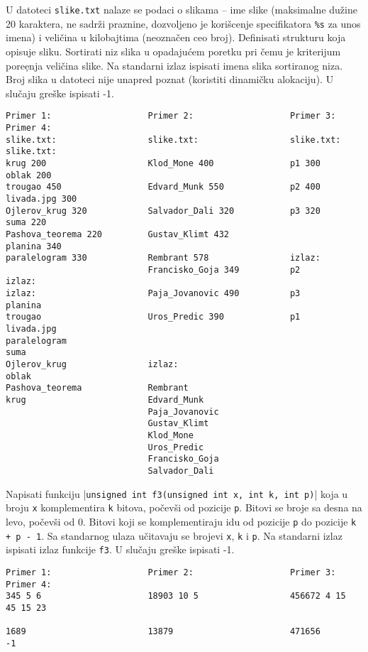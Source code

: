 \begin{z}
 U datoteci \verb|slike.txt| nalaze se podaci o slikama -- ime slike (maksimalne du\v zine 20 karaktera,
 ne sadr\v zi praznine, dozvoljeno je kori\v scenje specifikatora \verb|%s| za unos imena) i
 veli\v cina u kilobajtima (neozna\v cen ceo broj). Definisati strukturu koja opisuje sliku.
 Sortirati niz slika u opadaju\'cem poretku pri \v cemu je kriterijum pore\d enja veli\v cina slike.
 Na standarni izlaz ispisati imena slika sortiranog niza. Broj slika u datoteci nije unapred
 poznat (koristiti dinami\v cku alokaciju). U slu\v caju gre\v ske ispisati -1.
\end{z}
\begin{verbatim}
Primer 1:                   Primer 2:                   Primer 3:           Primer 4:
slike.txt:                  slike.txt:                  slike.txt:          slike.txt:
krug 200                    Klod_Mone 400               p1 300              oblak 200
trougao 450                 Edvard_Munk 550             p2 400              livada.jpg 300
Ojlerov_krug 320            Salvador_Dali 320           p3 320              suma 220
Pashova_teorema 220         Gustav_Klimt 432                                planina 340
paralelogram 330            Rembrant 578                izlaz:
                            Francisko_Goja 349          p2                  izlaz:
izlaz:                      Paja_Jovanovic 490          p3                  planina
trougao                     Uros_Predic 390             p1                  livada.jpg
paralelogram                                                                suma
Ojlerov_krug                izlaz:                                          oblak
Pashova_teorema             Rembrant
krug                        Edvard_Munk
                            Paja_Jovanovic
                            Gustav_Klimt
                            Klod_Mone
                            Uros_Predic
                            Francisko_Goja
                            Salvador_Dali
\end{verbatim}

\begin{z}
Napisati funkciju |\verb|unsigned int f3(unsigned int x, int k, int p)|| koja u broju \verb|x| komplementira
\verb|k| bitova, po\v cev\v si od pozicije \verb|p|. Bitovi se broje sa desna na levo, po\v cev\v si od 0.
Bitovi koji se komplementiraju idu od pozicije \verb|p| do pozicije \verb|k + p - 1|.
Sa standarnog ulaza u\v citavaju se brojevi \verb|x|, \verb|k| i \verb|p|. Na standarni izlaz ispisati
izlaz funkcije \verb|f3|. U slu\v caju gre\v ske ispisati -1.
\end{z}
\begin{verbatim}
Primer 1:                   Primer 2:                   Primer 3:           Primer 4:
345 5 6                     18903 10 5                  456672 4 15         45 15 23

1689                        13879                       471656              -1
\end{verbatim}

